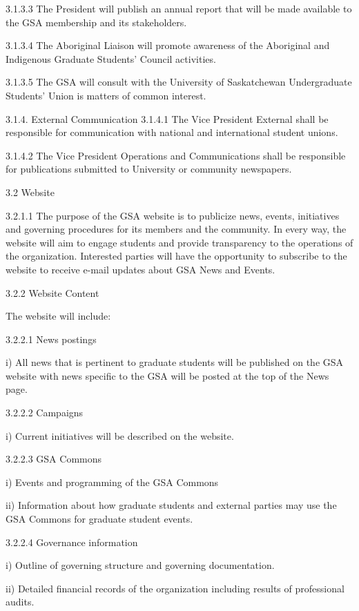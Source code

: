  3.1.3.3 The President will publish an annual report that will be made 
 available to the GSA membership and its stakeholders. 
 
 3.1.3.4 The Aboriginal Liaison will promote awareness of the Aboriginal and 
 Indigenous Graduate Students’ Council activities. 
 
 3.1.3.5 The GSA will consult with the University of Saskatchewan 
 Undergraduate Students’ Union is matters of common interest. 
 
 3.1.4. External Communication 
 3.1.4.1 The Vice President External shall be responsible for communication 
 with national and international student unions. 
 
 3.1.4.2 The Vice President Operations and Communications shall be 
 responsible for publications submitted to University or community 
 newspapers. 
 
 
 3.2 Website 
 
 3.2.1.1 The purpose of the GSA website is to publicize news, events, 
 initiatives and governing procedures for its members and the community. In every way, the website will aim to engage students and provide 
 transparency to the operations of the organization. Interested parties will 
 have the opportunity to subscribe to the website to receive e-mail updates 
 about GSA News and Events. 
 
 3.2.2 Website Content 
 
 The website will include: 
 
 3.2.2.1 News postings 
 
 i) All news that is pertinent to graduate students will be published on the 
 GSA website with news specific to the GSA will be posted at the top of 
 the News page. 
 
 3.2.2.2 Campaigns 
 
 i) Current initiatives will be described on the website. 
 
 3.2.2.3 GSA Commons 
 
 i) Events and programming of the GSA Commons 
 
 ii) Information about how graduate students and external parties may use 
 the GSA Commons for graduate student events. 
 
 3.2.2.4 Governance information 
 
 i) Outline of governing structure and governing documentation. 
 
 ii) Detailed financial records of the organization including results of 
 professional audits. 
 

